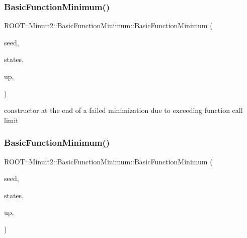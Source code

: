 \subsubsection{\texorpdfstring{BasicFunctionMinimum()}{BasicFunctionMinimum()}\hspace{0.1cm}{\footnotesize\ttfamily [3/10]}}
{\footnotesize\ttfamily R\+O\+O\+T\+::\+Minuit2\+::\+Basic\+Function\+Minimum\+::\+Basic\+Function\+Minimum (\begin{DoxyParamCaption}\item[{const \mbox{\hyperlink{classROOT_1_1Minuit2_1_1MinimumSeed}{Minimum\+Seed}} \&}]{seed,  }\item[{const std\+::vector$<$ \mbox{\hyperlink{classROOT_1_1Minuit2_1_1MinimumState}{Minimum\+State}} $>$ \&}]{states,  }\item[{double}]{up,  }\item[{\mbox{\hyperlink{classROOT_1_1Minuit2_1_1BasicFunctionMinimum_1_1MnReachedCallLimit}{Mn\+Reached\+Call\+Limit}}}]{ }\end{DoxyParamCaption})\hspace{0.3cm}{\ttfamily [inline]}}



constructor at the end of a failed minimization due to exceeding function call limit 

\mbox{\label{classROOT_1_1Minuit2_1_1BasicFunctionMinimum_ae30a460175a2bbf715f3ee0d6092c8b6}} 
\subsubsection{\texorpdfstring{BasicFunctionMinimum()}{BasicFunctionMinimum()}\hspace{0.1cm}{\footnotesize\ttfamily [4/10]}}
{\footnotesize\ttfamily R\+O\+O\+T\+::\+Minuit2\+::\+Basic\+Function\+Minimum\+::\+Basic\+Function\+Minimum (\begin{DoxyParamCaption}\item[{const \mbox{\hyperlink{classROOT_1_1Minuit2_1_1MinimumSeed}{Minimum\+Seed}} \&}]{seed,  }\item[{const std\+::vector$<$ \mbox{\hyperlink{classROOT_1_1Minuit2_1_1MinimumState}{Minimum\+State}} $>$ \&}]{states,  }\item[{double}]{up,  }\item[{\mbox{\hyperlink{classROOT_1_1Minuit2_1_1BasicFunctionMinimum_1_1MnAboveMaxEdm}{Mn\+Above\+Max\+Edm}}}]{ }\end{DoxyParamCaption})\hspace{0.3cm}{\ttfamily [inline]}}




